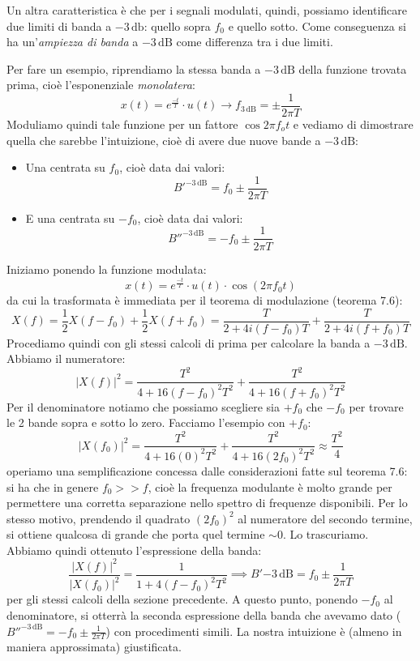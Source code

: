 \documentclass[a4paper,11pt]{article}
\begin{document}
Un altra caratteristica è che per i segnali modulati, quindi, possiamo identificare due limiti di banda a $-3 \, \mathrm{db}$: quello sopra $f_0$ e quello sotto.
Come conseguenza si ha un’\textit{ampiezza di banda} a $-3 \, \mathrm{dB}$ come differenza tra i due limiti.

\par\smallskip

Per fare un esempio, riprendiamo la stessa banda a $-3 \, \mathrm{dB}$ della funzione trovata prima, cioè l'esponenziale \textit{monolatera}:
$$
x(t) = e^{\frac{-t}{T}} \cdot u(t) \rightarrow f_{3\,\mathrm{dB}} = \pm \frac{1}{2 \pi T}
$$
Moduliamo quindi tale funzione per un fattore $\cos{2 \pi f_o t}$ e vediamo di dimostrare quella che sarebbe l'intuizione, cioè di avere due nuove bande a $-3\,\mathrm{dB}$:
\begin{itemize}
	\item Una centrata su $f_0$, cioè data dai valori:
		$$
		B'^{-3 \, \mathrm{dB}} = f_0 \pm \frac{1}{2 \pi T}
		$$
	\item E una centrata su $-f_0$, cioè data dai valori:
		$$
		B''^{-3 \, \mathrm{dB}} = -f_0 \pm \frac{1}{2 \pi T}
		$$
\end{itemize}

Iniziamo ponendo la funzione modulata:
$$
x(t) = e^{\frac{-t}{T}} \cdot u(t) \cdot \cos(2 \pi f_0 t)
$$
da cui la trasformata è immediata per il teorema di modulazione (teorema 7.6):
$$
X(f) = \frac{1}{2} X(f - f_0) + \frac{1}{2} X(f + f_0) 
= \frac{T}{2 + 4 i (f - f_0) T} + \frac{T}{2 + 4 i (f + f_0) T}
$$
Procediamo quindi con gli stessi calcoli di prima per calcolare la banda a $-3 \, \mathrm{dB}$. Abbiamo il numeratore:
$$
|X(f)|^2 = \frac{T^2}{4 + 16(f - f_0)^2 T^2} + \frac{T^2}{4 + 16(f + f_0)^2 T^2}
$$
Per il denominatore notiamo che possiamo scegliere sia $+f_0$ che $-f_0$ per trovare le 2 bande sopra e sotto lo zero. Facciamo l'esempio con $+f_0$:
$$
|X(f_0)|^2 = \frac{T^2}{4 + 16 (0)^2 T^2} + \frac{T^2}{4 + 16(2 f_0)^2 T^2} \approx \frac{T^2}{4}
$$
operiamo una semplificazione concessa dalle considerazioni fatte sul teorema 7.6: si ha che in genere $f_0 >> f$, cioè la frequenza modulante è molto grande per permettere una corretta separazione nello spettro di frequenze disponibili. Per lo stesso motivo, prendendo il quadrato $(2 f_0)^2$ al numeratore del secondo termine, si ottiene qualcosa di grande che porta quel termine $\sim 0$. Lo trascuriamo.
Abbiamo quindi ottenuto l'espressione della banda:
$$
\frac{|X(f)|^2}{|X(f_0)|^2} = \frac{1}{1 + 4 (f - f_0)^2 T^2} \implies B'{-3 \, \mathrm{dB}} = f_0 \pm \frac{1}{2 \pi T}
$$
per gli stessi calcoli della sezione precedente. A questo punto, ponendo $-f_0$ al denominatore, si otterrà la seconda espressione della banda che avevamo dato ($B''^{-3 \, \mathrm{dB}} = -f_0 \pm \frac{1}{2 \pi T}$) con procedimenti simili. La nostra intuizione è (almeno in maniera approssimata) giustificata.
\end{document}
